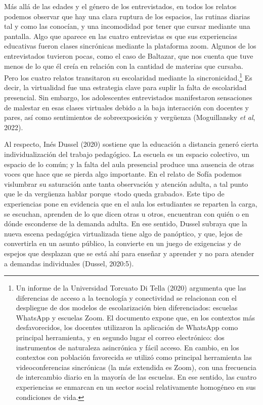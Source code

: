 Más allá de las edades y el género de los entrevistados, en todos los relatos podemos observar que hay una clara ruptura de los espacios, las rutinas diarias tal y como las conocían, y una incomodidad por tener que cursar mediante una pantalla. Algo que aparece en las cuatro entrevistas es que sus experiencias educativas fueron clases sincrónicas mediante la plataforma zoom. Algunos de los entrevistados tuvieron pocas, como el caso de Baltazar, que nos cuenta que tuve menos de lo que él creía en relación con la cantidad de materias que cursaba. Pero los cuatro relatos transitaron su escolaridad mediante la sincronicidad.\footnote{Un informe de la Universidad Torcuato Di Tella (2020) argumenta que las diferencias de acceso a la tecnología y conectividad se relacionan con el despliegue de dos modelos de escolarización bien diferenciados: escuelas WhatsApp y escuelas Zoom. El documento expone que, en los contextos más desfavorecidos, los docentes utilizaron la aplicación de WhatsApp como principal herramienta, y en segundo lugar el correo electrónico: dos instrumentos de naturaleza asincrónica y fácil acceso. En cambio, en los contextos con población favorecida se utilizó como principal herramienta las videoconferencias sincrónicas (la más extendida es Zoom), con una frecuencia de intercambio diario en la mayoría de las escuelas. En ese sentido, las cuatro experiencias se enmarcan en un sector social relativamente homogéneo en sus condiciones de vida.} Es decir, la virtualidad fue una estrategia clave para suplir la falta de escolaridad presencial. Sin embargo, los adolescentes entrevistados manifestaron sensaciones de malestar en esas clases virtuales debido a la baja interacción con docentes y pares, así como sentimientos de sobreexposición y vergüenza (Moguillansky \emph{et al}, 2022).

Al respecto, Inés Dussel (2020) sostiene que la educación a distancia generó cierta individualización del trabajo pedagógico. La escuela es un espacio colectivo, un espacio de lo común; y la falta del aula presencial produce una ausencia de otras voces que hace que se pierda algo importante. En el relato de Sofía podemos vislumbrar su saturación ante tanta observación y atención adulta, a tal punto que le da vergüenza hablar porque «todo queda grabado». Este tipo de experiencias pone en evidencia que en el aula los estudiantes se reparten la carga, se escuchan, aprenden de lo que dicen otras u otros, encuentran con quién o en dónde esconderse de la demanda adulta. En ese sentido, Dussel subraya que la nueva escena pedagógica virtualizada tiene algo de panóptico, y que, lejos de convertirla en un asunto público, la convierte en un juego de exigencias y de espejos que desplazan que se está ahí para enseñar y aprender y no para atender a demandas individuales (Dussel, 2020:5).

